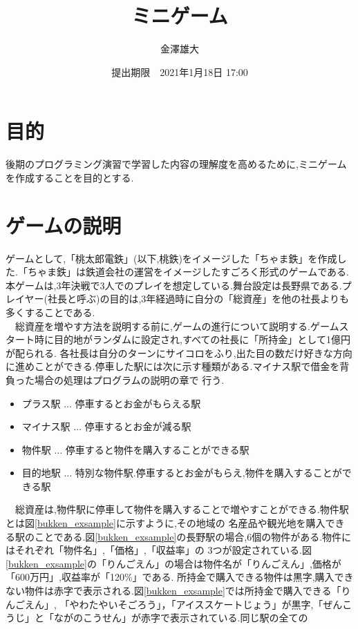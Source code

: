 \documentclass[a4j]{jarticle}
\title{ミニゲーム}
\date{提出期限　2021年1月18日 17:00}
\author{金澤雄大}
\begin{document}
    \maketitle
    \thispagestyle{empty}
    \clearpage
    \addtocounter{page}{-1}
    \section{目的}
    後期のプログラミング演習で学習した内容の理解度を高めるために,ミニゲームを作成することを目的とする.
    \section{ゲームの説明}
    ゲームとして,「桃太郎電鉄」\cite{mmtt}(以下,桃鉄)をイメージした「ちゃま鉄」を作成した.「ちゃま鉄」は鉄道会社の運営をイメージしたすごろく形式のゲームである.
    本ゲームは,3年決戦で3人でのプレイを想定している.舞台設定は長野県である.プレイヤー(社長と呼ぶ)の目的は,3年経過時に自分の「総資産」を他の社長よりも多くすることである.\\
    　総資産を増やす方法を説明する前に,ゲームの進行について説明する.ゲームスタート時に目的地がランダムに設定され,すべての社長に「所持金」として1億円が配られる.
    各社長は自分のターンにサイコロをふり,出た目の数だけ好きな方向に進めことができる.停車した駅には次に示す種類がある.マイナス駅で借金を背負った場合の処理はプログラムの説明の章で
    行う.
    \begin{itemize}
      \item プラス駅 $\dots$ 停車するとお金がもらえる駅
      \item マイナス駅 $\dots$ 停車するとお金が減る駅
      \item 物件駅 $\dots$ 停車すると物件を購入することができる駅
      \item 目的地駅 $\dots$ 特別な物件駅.停車するとお金がもらえ,物件を購入することができる駅
    \end{itemize}
    　総資産は,物件駅に停車して物件を購入することで増やすことができる.物件駅とは図\ref{bukken_exsample}に示すように,その地域の
    名産品や観光地を購入できる駅のことである.図\ref{bukken_exsample}の長野駅の場合,6個の物件がある.物件にはそれぞれ「物件名」,「価格」,「収益率」の
    3つが設定されている.図\ref{bukken_exsample}の「りんごえん」の場合は物件名が「りんごえん」,価格が「600万円」,収益率が「120\%」である.
    所持金で購入できる物件は黒字,購入できない物件は赤字で表示される.図\ref{bukken_exsample}では所持金で購入できる「りんごえん」,
    「やわたやいそごろう」，「アイススケートじょう」が黒字,「ぜんこうじ」と「ながのこうせん」が赤字で表示されている.同じ駅の全ての
\end{document}
